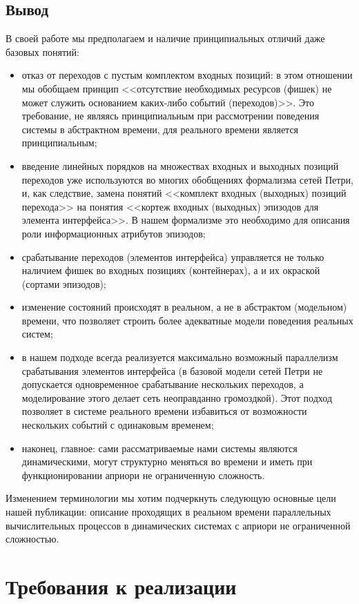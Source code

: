 \section{Вывод}
В своей работе мы предполагаем и наличие принципиальных отличий даже базовых понятий: 
\begin{itemize}
	\item отказ от переходов с пустым комплектом входных позиций: в этом отношении мы обобщаем принцип <<отсутствие необходимых ресурсов (фишек) не может служить основанием каких-либо событий (переходов)>>. Это требование, не являясь принципиальным при рассмотрении поведения системы в абстрактном времени, для реального времени является принципиальным;
	\item введение линейных порядков на множествах входных и выходных позиций переходов уже используются во многих обобщениях формализма сетей Петри, и, как следствие, замена понятий <<комплект входных (выходных) позиций перехода>> на понятия <<кортеж входных (выходных) эпизодов для элемента интерфейса>>. В  нашем формализме это необходимо для описания роли информационных атрибутов эпизодов;
	\item срабатывание переходов (элементов интерфейса) управляется не только наличием фишек во входных позициях (контейнерах), а и их окраской (сортами эпизодов);
	\item изменение состояний происходят в реальном, а не в абстрактом (модельном) времени, что позволяет строить более адекватные модели поведения реальных систем;
	\item в нашем подходе всегда реализуется максимально возможный параллелизм срабатывания элементов интерфейса (в базовой модели сетей Петри не допускается одновременное срабатывание нескольких переходов, а моделирование этого делает сеть неоправданно громоздкой). Этот подход позволяет в системе реального времени избавиться от возможности нескольких событий с одинаковым временем;
	\item наконец, главное: сами рассматриваемые нами системы являются динамическими, могут структурно меняться во времени и иметь при функционировании априори не ограниченную сложность.
\end{itemize}

Изменением терминологии мы хотим подчеркнуть следующую основные цели нашей публикации: описание проходящих в реальном времени параллельных вычислительных процессов в динамических системах с априори не ограниченной сложностью.

\chapter{Требования к реализации}
